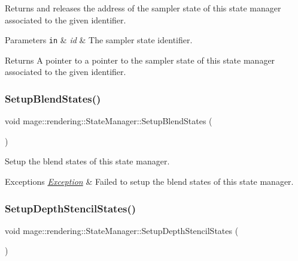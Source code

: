 Returns and releases the address of the sampler state of this state manager associated to the given identifier.


\begin{DoxyParams}[1]{Parameters}
\mbox{\tt in}  & {\em id} & The sampler state identifier. \\
\hline
\end{DoxyParams}
\begin{DoxyReturn}{Returns}
A pointer to a pointer to the sampler state of this state manager associated to the given identifier. 
\end{DoxyReturn}
\mbox{\label{classmage_1_1rendering_1_1_state_manager_a358133f8e2d012ddde64083e83650914}} 
\subsubsection{\texorpdfstring{Setup\+Blend\+States()}{SetupBlendStates()}}
{\footnotesize\ttfamily void mage\+::rendering\+::\+State\+Manager\+::\+Setup\+Blend\+States (\begin{DoxyParamCaption}{ }\end{DoxyParamCaption})\hspace{0.3cm}{\ttfamily [private]}}

Setup the blend states of this state manager.


\begin{DoxyExceptions}{Exceptions}
{\em \mbox{\hyperlink{classmage_1_1_exception}{Exception}}} & Failed to setup the blend states of this state manager. \\
\hline
\end{DoxyExceptions}
\mbox{\label{classmage_1_1rendering_1_1_state_manager_ae77e458a375e8cb2540eeb0230cb047b}} 
\subsubsection{\texorpdfstring{Setup\+Depth\+Stencil\+States()}{SetupDepthStencilStates()}}
{\footnotesize\ttfamily void mage\+::rendering\+::\+State\+Manager\+::\+Setup\+Depth\+Stencil\+States (\begin{DoxyParamCaption}{ }\end{DoxyParamCaption})\hspace{0.3cm}{\ttfamily [private]}}


